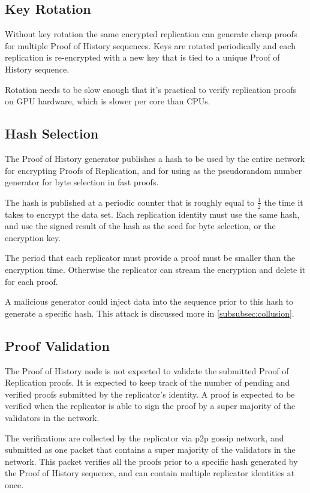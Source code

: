\documentclass[12pt]{article}
\begin{document}
\subsection{Key Rotation}

Without key rotation the same encrypted replication can generate cheap proofs for multiple Proof of History sequences. Keys are rotated periodically and each replication is re-encrypted with a new key that is tied to a unique Proof of History sequence.

Rotation needs to be slow enough that it’s practical to verify replication proofs on GPU hardware, which is slower per core than CPUs.

\subsection{Hash Selection}\label{hashselection}

The Proof of History generator publishes a hash to be used by the entire network for encrypting Proofs of Replication, and for using as the pseudorandom number generator for byte selection in fast proofs.

The hash is published at a periodic counter that is roughly equal to \(\frac{1}{2}\) the time it takes to encrypt the data set. Each replication identity must use the same hash, and use the signed result of the hash as the seed for byte selection, or the encryption key.

The period that each replicator must provide a proof must be smaller than the encryption time. Otherwise the replicator can stream the encryption and delete it for each proof.

A malicious generator could inject data into the sequence prior to this hash to generate a specific hash. This attack is discussed more in \ref{subsubsec:collusion}.

\subsection{Proof Validation}
The Proof of History node is not expected to validate the submitted Proof of Replication proofs. It is expected to keep track of the number of pending and verified proofs submitted by the replicator’s identity. A proof is expected to be verified when the replicator is able to sign the proof by a super majority of the validators in the network.

The verifications are collected by the replicator via p2p gossip network, and submitted as one packet that contains a super majority of the validators in the network. This packet verifies all the proofs prior to a specific hash generated by the Proof of History sequence, and can contain multiple replicator identities at once.
\end{document}
